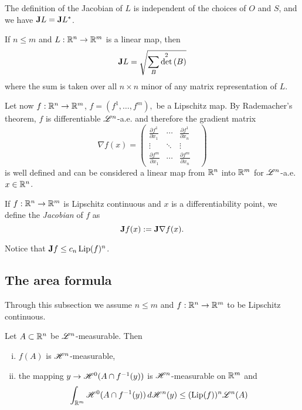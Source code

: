 \begin{remark}
The definition of the Jacobian of $L$ is independent of the choices of $O$ and $S$, and we have ${\bf J} L = {\bf J} L^{*}$.
\end{remark}

\begin{proposition} \label{Cauchy_Binet}
If $n \le m$ and $L: \mathbb{R}^{n} \to \mathbb{R}^{m}$ is a linear map, then
\begin{equation*}
{\bf J} L = \sqrt{ \sum_{B} \det^{2}{(B)}}
\end{equation*}
where the sum is taken over all $n\times n$ minor of any matrix representation of $L$.
\end{proposition}

Let now $f : \mathbb{R}^{n} \to \mathbb{R}^{m}$, $f = (f^{1}, \dots, f^{m}),$ be a Lipschitz map. By Rademacher's theorem, $f$ is differentiable $\mathscr{L}^{n}$-a.e. and therefore the gradient matrix 
\[\nabla f(x) = \begin{pmatrix} \frac{\partial f^{1}}{\partial x_{1}} & \cdots & \frac{\partial f^{1}}{\partial x_{n}} & \\ \vdots & \ddots & \vdots \\  \frac{\partial f^{m}}{\partial x_{1}} & \cdots & \frac{\partial f^{m}}{\partial x_{n}} & \end{pmatrix}\]
is well defined and can be considered a linear map from $\mathbb{R}^{n}$ into $\mathbb{R}^{m}$ for $\mathscr{L}^{n}$-a.e. $x \in \mathbb{R}^{n}$.

\begin{definition}
If $f : \mathbb{R}^{n} \to \mathbb{R}^{m}$ is Lipschitz continuous and $x$ is a differentiability point, we define the {\em Jacobian} of $f$ as $${\bf J} f(x) := {\bf J} \nabla f(x).$$
\end{definition}

\begin{remark}
Notice that ${\bf J} f \le c_n \operatorname{Lip}(f)^{n}$.
\end{remark}

\subsection{The area formula}

Through this subsection we assume $n \le m$ and $f : \mathbb{R}^{n} \to \mathbb{R}^{m}$ to be Lipschitz continuous.

\begin{lemma} Let $A \subset \mathbb{R}^{n}$ be $\mathscr{L}^{n}$-measurable. Then
\begin{enumerate}[i)]
\item $f(A)$ is $\mathscr{H}^{n}$-measurable,
\item the mapping $y \to \mathscr{H}^{0}(A \cap f^{-1}(y))$ is $\mathscr{H}^{n}$-measurable on $\mathbb{R}^{m}$ and
\begin{equation*}
\int_{\mathbb{R}^{m}} \mathscr{H}^{0}(A \cap f^{-1}(y)) \, d \mathscr{H}^{n}(y) \le (\operatorname{Lip}(f))^{n} \mathscr{L}^{n}(A)
\end{equation*}
\end{enumerate}
\end{lemma}

